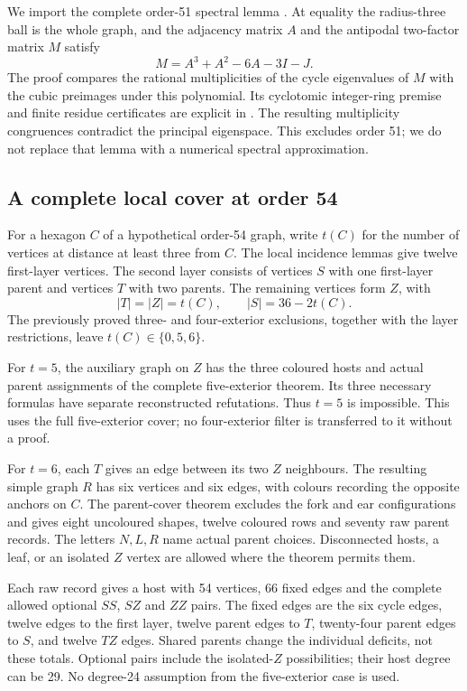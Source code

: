\documentclass[11pt,a4paper]{article}
\begin{document}
We import the complete order-51 spectral lemma \cite{reduction}.
At equality the radius-three ball is the whole graph, and the adjacency
matrix $A$ and the antipodal two-factor matrix $M$ satisfy
\[
             M=A^3+A^2-6A-3I-J.
\]
The proof compares the rational multiplicities of the cycle eigenvalues
of $M$ with the cubic preimages under this polynomial. Its cyclotomic
integer-ring premise and finite residue certificates are explicit in
\cite{reduction}. The resulting multiplicity congruences contradict the
principal eigenspace. This excludes order 51; we do not replace that
lemma with a numerical spectral approximation.

\subsection{A complete local cover at order 54}
For a hexagon $C$ of a hypothetical order-54 graph, write $t(C)$ for the
number of vertices at distance at least three from $C$. The local
incidence lemmas \cite{order54} give twelve first-layer vertices.
The second layer consists of vertices $S$ with one first-layer parent
and vertices $T$ with two parents. The remaining vertices form $Z$, with
\[
       |T|=|Z|=t(C),\qquad |S|=36-2t(C).
\]
The previously proved three- and four-exterior exclusions, together with
the layer restrictions, leave $t(C)\in\{0,5,6\}$.

For $t=5$, the auxiliary graph on $Z$ has the three coloured hosts and
actual parent assignments of the complete five-exterior theorem. Its
three necessary formulas have separate reconstructed refutations. Thus
$t=5$ is impossible. This uses the full five-exterior cover; no
four-exterior filter is transferred to it without a proof.

For $t=6$, each $T$ gives an edge between its two $Z$ neighbours. The
resulting simple graph $R$ has six vertices and six edges, with colours
recording the opposite anchors on $C$. The parent-cover theorem excludes
the fork and ear configurations and gives eight uncoloured shapes,
twelve coloured rows and seventy raw parent records. The letters
$N,L,R$ name actual parent choices. Disconnected hosts, a leaf, or an
isolated $Z$ vertex are allowed where the theorem permits them.

Each raw record gives a host with 54 vertices, 66 fixed edges and the
complete allowed optional $SS$, $SZ$ and $ZZ$ pairs. The fixed edges are
the six cycle edges, twelve edges to the first layer, twelve parent edges
to $T$, twenty-four parent edges to $S$, and twelve $TZ$ edges. Shared
parents change the individual deficits, not these totals. Optional
pairs include the isolated-$Z$ possibilities; their host degree can be
29. No degree-24 assumption from the five-exterior case is used.
\end{document}
